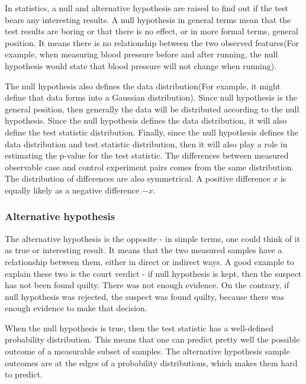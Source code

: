 \documentclass[12pt]{article}
\begin{document}
In statistics, a null and alternative hypothesis are raised to find out if the test bears any interesting results. A null hypothesis in general terms mean that the test results are boring or that there is no effect, or in more formal terms, general position. It means there is no relationship between the two observed features(For example, when measuring blood pressure before and after running, the null hypothesis would state that blood pressure will not change when running).

The null hypothesis also defines the data distribution(For example, it might define that data forms into a Gaussian distribution). Since null hypothesis is the general position, then generally the data will be distributed according to the null hypothesis. Since the null hypothesis defines the data distribution, it will also define the test statistic distribution. Finally, since the null hypothesis defines the data distribution and test statistic distribution, then it will also play a role in estimating the p-value for the test statistic. The differences between measured observable case and control experiment pairs comes from the same distribution. The distribution of differences are also symmetrical. A positive difference $x$ is equally likely as a negative difference $-x$.

\subsubsection{Alternative hypothesis}
The alternative hypothesis is the opposite - in simple terms, one could think of it as true or interesting result. It means that the two measured samples have a relationship between them, either in direct or indirect ways. A good example to explain these two is the court verdict - if null hypothesis is kept, then the suspect has not been found quilty. There was not enough evidence. On the contrary, if null hypothesis was rejected, the suspect was found quilty, because there was enough evidence to make that decision.

When the null hypothesis is true, then the test statistic has a well-defined probability distribution. This means that one can predict pretty well the possible outcome of a measurable subset of samples. The alternative hypothesis sample outcomes are at the edges of a probability distributions, which makes them hard to predict.
\end{document}
